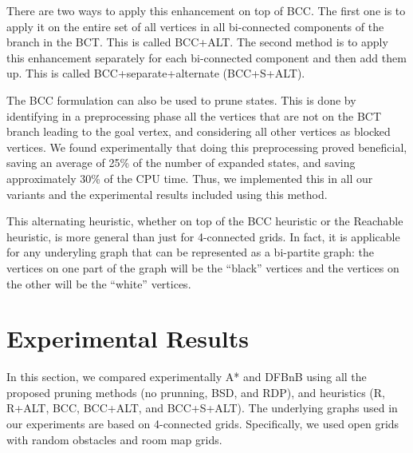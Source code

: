 \documentclass[letterpaper]{article} %
\newcommand\Yossi[1]{\nb{\textbf{Yossi:}}{green}{#1}}
\newcommand\Roni[1]{\nb{\textbf{Roni:}}{blue}{#1}}
\begin{document}
There are two ways to apply this enhancement on top of BCC. The first one is to apply it on the entire set of all vertices in all bi-connected components of the branch in the BCT. This is called BCC+ALT. 
The second method is to apply this enhancement separately for each bi-connected component and then add them up. This is called BCC+separate+alternate (BCC+S+ALT).




The BCC formulation can also be used to prune states. This is done by identifying in a preprocessing phase all the vertices that are not on the BCT branch leading to the goal vertex, 
and considering all other vertices as blocked vertices. We found experimentally that doing this preprocessing proved beneficial, saving an average of 25\% of the number of expanded states, and saving approximately 30\% of the CPU time. Thus, we implemented this in all our variants and the experimental results included using this  method. %



This alternating heuristic, whether on top of the BCC heuristic or the Reachable heuristic, is more general than just for 4-connected grids. In fact, it is applicable for any underyling graph that can be represented as a bi-partite graph: the vertices on one part of the graph will be the ``black'' vertices and the vertices on the other will be the ``white'' vertices. 


\section{Experimental Results}
\label{sec:experimental}
In this section, we compared experimentally 
A* and DFBnB using all the proposed pruning methods (no prunning, BSD, and RDP), 
and heuristics (R, R+ALT, BCC, BCC+ALT, and BCC+S+ALT). 
The underlying graphs used in our experiments are based on 4-connected grids. 
Specifically, we used open grids with random obstacles and room map grids. 
\end{document}
